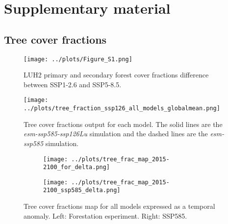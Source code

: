 \documentclass[]{article}
\begin{document}
\printbibliography

\section{Supplementary material}
\setcounter{figure}{0}

\subsection{Tree cover fractions}

\begin{figure}[H]
    \centering
    \texttt{[image: ../plots/Figure\_S1.png]}
    \caption{LUH2 primary and secondary forest cover fractions difference between SSP1-2.6 and SSP5-8.5.}
    \label{fig:LUH2DIFF}
\end{figure}

\begin{figure}[H]
    \centering
    \texttt{[image: ../plots/tree\_fraction\_ssp126\_all\_models\_globalmean.png]}
    \caption{Tree cover fractions output for each model. The solid lines are the \textit{esm-ssp585-ssp126Lu} simulation and the dashed lines are the \textit{esm-ssp585} simulation.}
    \label{fig:tree_fractions_models}
\end{figure}

\begin{figure}[H]
    \centering
    \begin{subfigure}[b]{0.4\linewidth}
        \texttt{[image: ../plots/tree\_frac\_map\_2015-2100\_for\_delta.png]}
    \end{subfigure}
    \begin{subfigure}[b]{0.4\linewidth}
        \texttt{[image: ../plots/tree\_frac\_map\_2015-2100\_ssp585\_delta.png]}
    \end{subfigure}
    \caption{Tree cover fractions map for all models expressed as a temporal anomaly. Left: Forestation esperiment. Right: SSP585.}
    \label{fig:tree_area_maps_ssp126Lu}
\end{figure}
\end{document}
